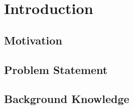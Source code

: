 \chapter{Introduction}
\label{sec:introduction}


\section{Motivation}
\label{sec:introduction:motivation}


\section{Problem Statement}
\label{sec:introduction:problem_statement}


\section{Background Knowledge}
\label{sec:introduction:background_knowledge}
